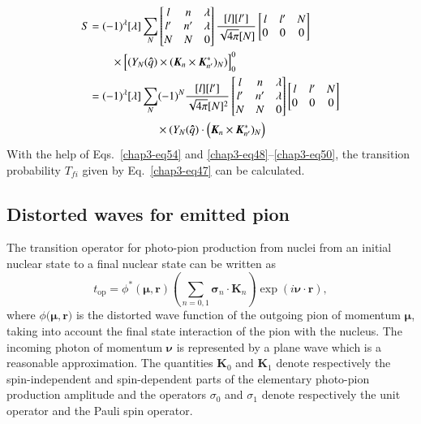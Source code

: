 \begin{align}
  S & = (-1)^\lambda [\lambda] \sum_{N} \begin{bmatrix} l & n & \lambda\\ l' & n' & \lambda\\ N & N & 0  \end{bmatrix}
  \frac{[l][l']}{\sqrt{4 \pi}[N]} \begin{bmatrix}l & l' & N\\ 0 & 0 & 0  \end{bmatrix}\notag \\
       & \qquad  \times \Bigl[(Y_N ({\boldsymbol \hat{q}}) \times ({\boldsymbol K}_n \times {\boldsymbol K_{n'}^\ast})_N)\Bigr]_0^0\notag \\
  & = (-1)^\lambda [\lambda] \sum_{N} (-1)^N  \frac{[l][l']}{\sqrt{4 \pi}[N]^2}
  \begin{bmatrix} l & n & \lambda\\ l' & n' & \lambda\\ N & N & 0  \end{bmatrix}
  \begin{bmatrix}l & l' & N\\ 0 & 0 & 0  \end{bmatrix} \notag \\
  & \qquad \qquad \qquad \times (Y_N ({\boldsymbol \hat{q}}) \cdot  \Bigl({\boldsymbol K}_n \times {\boldsymbol K_{n'}^\ast})_N\Bigr)\label{chap3-eq54}
\end{align}
With the help of Eqs.\ \eqref{chap3-eq54} and \eqref{chap3-eq48}--\eqref{chap3-eq50}, the transition probability $T_{fi}$ given by Eq.\ \eqref{chap3-eq47} can be calculated.

\subsection{Distorted waves for emitted pion} \label{chap3-sec5.2}

The transition operator for photo-pion production from nuclei from an initial nuclear state to a final nuclear state can be written as
\begin{equation}
t_{\text{op}} = \phi^\ast (\boldsymbol{\mu, r}) \left( \sum_{n=0, 1} {\boldsymbol\sigma}_n \cdot {\boldsymbol K}_n\right) \exp (i \boldsymbol{\nu \cdot r}), \label{chap3-eq55}
\end{equation}
where $\phi \boldsymbol{(\mu, r})$ is the distorted wave function of the outgoing pion of momentum $\boldsymbol{\mu}$, taking into account the final state interaction of the pion with the nucleus. The incoming photon of momentum $\boldsymbol{\nu}$ is represented by a plane wave which is a reasonable approximation. The quantities ${\boldsymbol K}_0$ and ${\boldsymbol K}_1$ denote respectively the spin-independent and spin-dependent parts of the elementary photo-pion production amplitude and the operators $\sigma_0$ and $\sigma_1$ denote respectively the unit operator and the Pauli spin operator.

